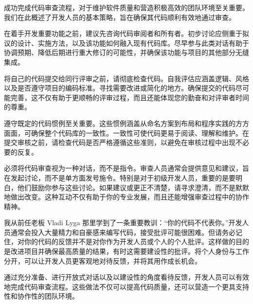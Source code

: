 
成功完成代码审查流程，对于维护软件质量和营造积极高效的团队环境至关重要。我们在此概述了开发人员的基本策略，旨在确保其代码顺利有效地通过审查。


在着手开发重要功能之前，建议先咨询代码审阅者和所有者。初步讨论应侧重于拟议的设计、实施方法，以及该功能如何融入现有代码库。尽早参与此类对话有助于协调预期、降低后期进行重大修订的可能性，并确保该功能与项目的其他部分无缝集成。


将自己的代码提交给同行评审之前，请彻底检查代码。自我评估应涵盖逻辑、风格以及是否遵守项目的编码标准。寻找需要改进或简化的地方。确保提交的代码尽可能完善，这不仅有助于更顺畅的评审过程，而且还能体现您的勤奋和对评审者时间的尊重。


遵守既定的代码惯例至关重要。这些惯例涵盖从命名方案到布局和程序实践的方方面面，可确保整个代码库的一致性。一致性可使代码更易于阅读、理解和维护。在提交审核之前，请检查代码是否严格遵循这些准则，以避免在审核过程中出现不必要的反复。


必须将代码审查视为一种对话，而不是指令。审查人员通常会提供意见和建议，旨在发起讨论，而不是单方面发号施令。特别是对于初级开发人员，重要的是要明白，他们鼓励你参与这些讨论。如果建议或更正不清楚，请寻求澄清，而不是默默地做出改变。这种互动不仅有助于你的专业发展，而且还能增强审查过程中的协作精神。


我从前任老板 Vladi Lyga 那里学到了一条重要教训：“你的代码不代表你。”开发人员通常会投入大量精力和自豪感来编写代码，接受批评可能很困难。但请务必记住，对你的代码的反馈并不是对你作为开发人员或个人的个人批评。这样做的目的是改进项目并确保最高质量的结果，有时这需要建设性的批评。将个人身份与工作分开，可以让开发人员更客观地对待反馈，并将其用作成长机会。

通过充分准备、进行开放式对话以及以建设性的角度看待反馈，开发人员可以有效地完成代码审查流程。这些做法不仅可以提高代码质量，还可以营造一个更具支持性和协作性的团队环境。

